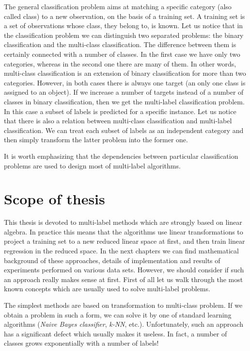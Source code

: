 The general classification problem aims at matching a specific category (also called class) to a new observation, on the basis of a training set. A training set is a set of observations whose class, they belong to, is known. Let us notice that in the classification problem we can distinguish two separated problems: the binary classification and the multi-class classification. The difference between them is certainly connected with a number of classes. In the first case we have only two categories, whereas in the second one there are many of them. In other words, multi-class classification is an extension of binary classification for more than two categories. However, in both cases there is always one target (an only one class is assigned to an object). If we increase a number of targets instead of a number of classes in binary classification, then we get the multi-label classification problem. In this case a subset of labels is predicted for a specific instance. Let us notice that there is also a relation between multi-class classification and multi-label classification. We can treat each subset of labels as an independent category and then simply transform the latter problem into the former one. 

It is worth emphasizing that the dependencies between particular classification problems are used to design most of multi-label algorithms. 

\section{Scope of thesis}

This thesis is devoted to multi-label methods which are strongly based on linear algebra. In practice this means that the algorithms use linear transformations to project a training set to a new reduced linear space at first, and then train linear regression in the reduced space. In the next chapters we can find mathematical background of these approaches, details of implementation and results of experiments performed on various data sets. However, we should consider if such an approach really makes sense at first. First of all let us walk through the most known concepts which are usually used to solve multi-label problems.

The simplest methods are based on transformation to multi-class problem. If we obtain a problem in such a form, we can solve it by one of standard learning algorithms (\textit{Naive Bayes classifier}, \textit{k-NN}, etc.). Unfortunately, such an approach has a significant defect which usually makes it useless. In fact, a number of classes grows exponentially with a number of labels!

